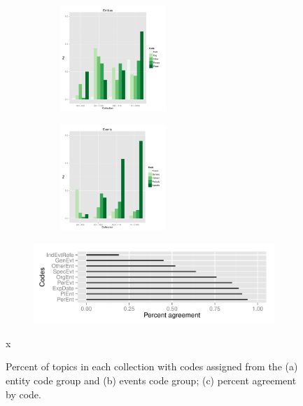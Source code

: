 \documentclass[runningheads,a4paper]{llncs}
\begin{document}
\begin{figure}
\centering
\begin{subfigure}{.5\textwidth}
  \centering
\includegraphics[width=6cm, height=4cm]{plots/topic-groups-ent.pdf}
\end{subfigure}%
\begin{subfigure}{.5\textwidth}
  \centering
\includegraphics[width=6cm, height=4cm]{plots/topic-groups-evt.pdf}
\end{subfigure}
\begin{subfigure}{\textwidth}
\includegraphics[width=11cm]{plots/coder-agreement.pdf}
\end{subfigure}x
\caption{Percent of topics in each collection with codes assigned from the (a) entity code group and (b) events code group; (c) percent agreement by code.}
\label{fig.codedist}
\end{figure}

\end{document}
